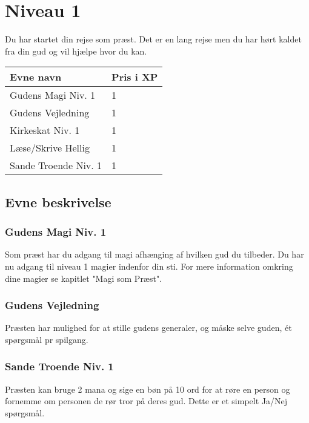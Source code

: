 \chapter{Niveau 1}
Du har startet din rejse som præst. Det er en lang rejse men du har hørt kaldet fra din gud og vil hjælpe hvor du kan.

\begin{table}[H]
    \centering
    \begin{tabular}{|p{}|p{}|}
    \rowcolor{cerulean!80}\hline
        Evne navn & Pris i XP \\\hline
            Gudens Magi Niv. 1 & 1 \\\hline
            Gudens Vejledning & 1 \\\hline
            Kirkeskat Niv. 1 & 1 \\\hline
            Læse/Skrive Hellig & 1 \\\hline
            Sande Troende Niv. 1& 1 \\\hline
    \end{tabular}
\end{table}

\section{Evne beskrivelse}

\subsection{Gudens Magi Niv. 1}
Som præst har du adgang til magi afhænging af hvilken gud du tilbeder. Du har nu adgang til niveau 1 magier indenfor din sti. For mere information omkring dine magier se kapitlet "Magi som Præst".

\subsection{Gudens Vejledning}
Præsten har mulighed for at stille gudens generaler, og måske selve guden, ét spørgsmål pr spilgang.





\subsection{Sande Troende Niv. 1}
Præsten kan bruge 2 mana og sige en bøn på 10 ord for at røre en person og fornemme om personen de rør tror på deres gud. Dette er et simpelt Ja/Nej spørgsmål. 